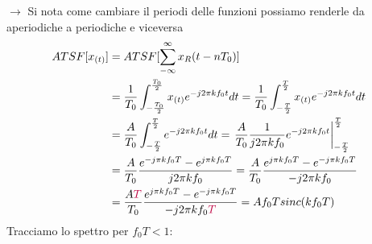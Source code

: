                $\rightarrow$ Si nota come cambiare il periodi delle funzioni possiamo renderle da aperiodiche a periodiche e viceversa
                \begin{align}
                    ATSF[x_{(t)}] & = ATSF[\sum_{-\infty}^{\infty} x_R (t-nT_0)] \nonumber \\
                        & = \frac{1}{T_0} \int_{-\frac{T_0}{2}}^{\frac{T_0}{2}} x_{(t)} e^{-j2\pi kf_0t} dt = \frac{1}{T_0} \int_{-\frac{T}{2}}^{\frac{T}{2}} x_{(t)} e^{-j2\pi kf_0t} dt \nonumber \\
                        & = \frac{A}{T_0} \int_{-\frac{T}{2}}^{\frac{T}{2}} e^{-j2\pi kf_0t} dt = \eval{\frac{A}{T_0} \frac{1}{j2\pi kf_0} e^{-j2\pi kf_0t}}_{-\frac{T}{2}}^{\frac{T}{2}} \nonumber \\
                        & = \frac{A}{T_0} \frac{e^{-j\pi kf_0T} - e^{j\pi kf_0T}}{j2\pi kf_0} = \frac{A}{T_0} \frac{e^{j\pi kf_0T}-e^{-j\pi kf_0T}}{-j2\pi kf_0} \nonumber \\
                        & = \frac{A\color{purple}{T}}{T_0} \frac{e^{j\pi kf_0T}-e^{-j\pi kf_0T}}{-j2\pi kf_0\color{purple}{T}} = Af_0T sinc(kf_0T) \nonumber 
                \end{align}
                Tracciamo lo spettro per $f_0T<1$:
